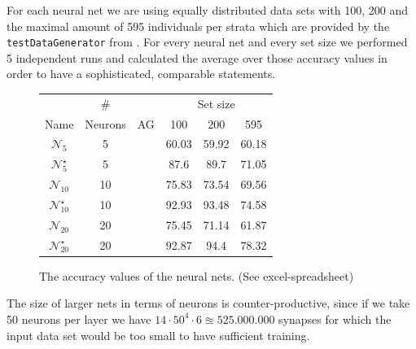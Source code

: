 \documentclass[runningheads]{llncs}
\newcommand{\cmark}{\ding{51}}%
\newcommand{\xmark}{\ding{55}}%
\begin{document}
	For each neural net we are using equally distributed data sets with 100, 200 and the maximal amount of 595 individuals per strata which are provided by the \texttt{testDataGenerator} from . For every neural net and every set size we performed 5 independent runs and calculated the average over those accuracy values in order to have a sophisticated, comparable statements. 
	\setlength\tabcolsep{.2cm}
	\begin{figure}[H]
		\centering
		\begin{tabular}{|c|c|c|c|c|c|}
			\hline
			&   \#    &        & \multicolumn{3}{c|}{Set size} \\
			Name           & Neurons &   AG   &  100  &  200  &      595      \\ \hline
			$\mathcal{N}_5$      &    5    & \xmark & 60.03 & 59.92 &     60.18     \\
			$\mathcal{N}_5^\star$   &    5    & \cmark & 87.6  & 89.7  &     71.05     \\
			$\mathcal{N}_{10}$    &   10    & \xmark & 75.83 & 73.54 &     69.56     \\
			$\mathcal{N}_{10}^\star$ &   10    & \cmark & 92.93 & 93.48 &     74.58     \\		
			$\mathcal{N}_{20}$    &   20    & \xmark & 75.45 & 71.14 &     61.87     \\
			$\mathcal{N}_{20}^\star$ &   20    & \cmark & 92.87 & 94.4  &     78.32     \\ \hline
		\end{tabular}
		\caption{The accuracy values of the neural nets. (See excel-spreadsheet)}
		\label{tab: nn-accuracy}
	\end{figure}
	
	The size of larger nets in terms of neurons is counter-productive, since if we take 50 neurons per layer we have $14 \cdot 50^4 \cdot 6 \approxeq 525.000.000$ synapses for which the input data set would be too small to have sufficient training.\\
	
\end{document}
